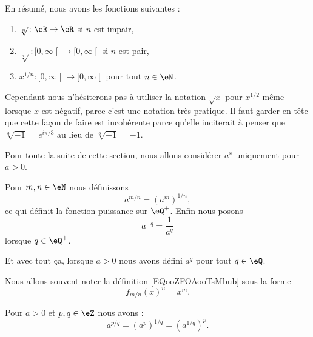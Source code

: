 En résumé, nous avons les fonctions suivantes :
\begin{enumerate}
    \item
        \( \sqrt[n]{  }\colon \eR\to \eR\) si \( n\) est impair,
    \item
        \( \sqrt[n]{  }\colon \mathopen[ 0 , \infty \mathclose[\to \mathopen[ 0 , \infty \mathclose[ \) si \( n\) est pair,
    \item
        \( x^{1/n}\colon \mathopen[ 0 , \infty \mathclose[\to \mathopen[ 0 , \infty \mathclose[\) pour tout \( n\in \eN\).
\end{enumerate}
Cependant nous n'hésiterons pas à utiliser la notation \( \sqrt{ x }\) pour \( x^{1/2}\) même lorsque \( x\) est négatif, parce c'est une notation très pratique. Il faut garder en tête que cette façon de faire est incohérente parce qu'elle inciterait à penser que \( \sqrt[3]{-1  }= e^{i\pi/3}\) au lieu de \( \sqrt[3]{-1  }=-1\).

Pour toute la suite de cette section, nous allons considérer \( a^x\) uniquement pour \( a>0\).

\begin{definition}
    Pour \( m,n\in \eN\) nous définissons 
    \begin{equation}        \label{EQooZFOAooTsMbub}
        a^{m/n}=(a^m)^{1/n},
    \end{equation}
    ce qui définit la fonction puissance sur \( \eQ^+\). Enfin nous posons
    \begin{equation}
        a^{-q}=\frac{1}{ a^q }
    \end{equation}
    lorsque \( q\in \eQ^+\).

    Et avec tout ça, lorsque \( a>0\) nous avons défini \( a^q\) pour tout \( q\in \eQ\).
\end{definition}

Nous allons souvent noter la définition \eqref{EQooZFOAooTsMbub} sous la forme
\begin{equation}        \label{EQooZIKKooVfjkZo}
    f_{m/n}(x)^n=x^m.
\end{equation}

\begin{lemma}        \label{LEMooIDLJooZALNaD}
    Pour \( a>0\) et \( p,q\in \eZ\) nous avons :
    \begin{equation}
        a^{p/q}=(a^p)^{1/q}=(a^{1/q})^p.
    \end{equation}
\end{lemma}

